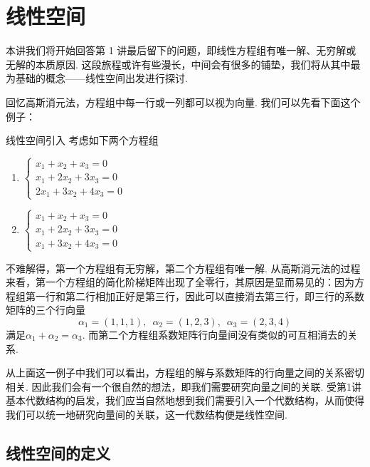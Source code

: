 \chapter{线性空间}

本讲我们将开始回答第 1 讲最后留下的问题，即线性方程组有唯一解、无穷解或无解的本质原因. 这段旅程或许有些漫长，中间会有很多的铺垫，我们将从其中最为基础的概念——线性空间出发进行探讨.

回忆高斯消元法，方程组中每一行或一列都可以视为向量. 我们可以先看下面这个例子：
\begin{example}{}{线性空间引入}
    考虑如下两个方程组
    \begin{multicols}{2}
        \begin{enumerate}
            \item $\begin{cases}
                          x_1+x_2+x_3=0   \\
                          x_1+2x_2+3x_3=0 \\
                          2x_1+3x_2+4x_3=0
                      \end{cases}$

            \item $\begin{cases}
                          x_1+x_2+x_3=0   \\
                          x_1+2x_2+3x_3=0 \\
                          x_1+3x_2+4x_3=0
                      \end{cases}$
        \end{enumerate}
    \end{multicols}
    不难解得，第一个方程组有无穷解，第二个方程组有唯一解. 从高斯消元法的过程来看，第一个方程组的简化阶梯矩阵出现了全零行，其原因是显而易见的：因为方程组第一行和第二行相加正好是第三行，因此可以直接消去第三行，即三行的系数矩阵的三个行向量
    \[\alpha_1=(1,1,1),\enspace\alpha_2=(1,2,3),\enspace\alpha_3=(2,3,4)\]
    满足$\alpha_1+\alpha_2=\alpha_3$. 而第二个方程组系数矩阵行向量间没有类似的可互相消去的关系.
\end{example}

从上面这一例子中我们可以看出，方程组的解与系数矩阵的行向量之间的关系密切相关. 因此我们会有一个很自然的想法，即我们需要研究向量之间的关联. 受第1讲基本代数结构的启发，我们应当自然地想到我们需要引入一个代数结构，从而使得我们可以统一地研究向量间的关联，这一代数结构便是线性空间.

\section{线性空间的定义}

